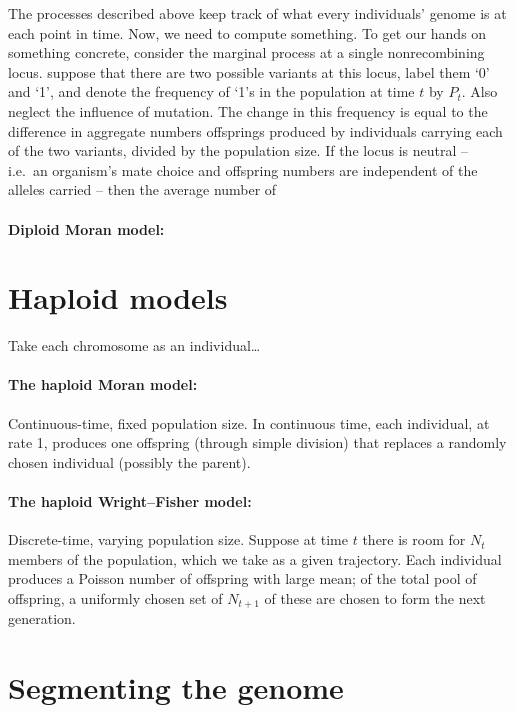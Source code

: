 The processes described above keep track of what every individuals' genome is at each point in time.
Now, we need to compute something.
To get our hands on something concrete, consider the marginal process at a single nonrecombining locus.
suppose that there are two possible variants at this locus,
label them `0' and `1',
and denote the frequency of `1's in the population at time $t$ by $P_t$.
Also neglect the influence of mutation.
The change in this frequency is equal to the difference in aggregate numbers offsprings produced by individuals 
carrying each of the two variants,
divided by the population size.
If the locus is neutral
-- i.e.\ an organism's mate choice and offspring numbers are independent of the alleles carried --
then the average number of 

\paragraph{Diploid Moran model:}


\section{Haploid models}

Take each chromosome as an individual\ldots

\paragraph{The haploid Moran model:}
Continuous-time, fixed population size.
In continuous time, each individual, at rate 1, 
produces one offspring (through simple division)
that replaces a randomly chosen individual (possibly the parent).

\paragraph{The haploid Wright--Fisher model:}
Discrete-time, varying population size.
Suppose at time $t$ there is room for $N_t$ members of the population,
which we take as a given trajectory.
Each individual produces a Poisson number of offspring with large mean;
of the total pool of offspring, a uniformly chosen set of $N_{t+1}$ of these
are chosen to form the next generation.




\section{Segmenting the genome}

